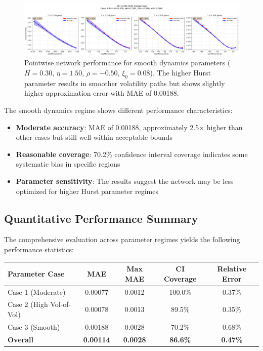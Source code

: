 	\begin{figure}[ht]
		\centering
		\includegraphics[width=\textwidth]{../images/pointwise_case3_comparison.png}
		\caption{Pointwise network performance for smooth dynamics parameters ($H = 0.30$, $\eta = 1.50$, $\rho = -0.50$, $\xi_0 = 0.08$). The higher Hurst parameter results in smoother volatility paths but shows slightly higher approximation error with MAE of 0.00188.}
		\label{fig:pointwise-case3}
	\end{figure}
				
	The smooth dynamics regime shows different performance characteristics:
	
	\begin{itemize}[nosep]
		\item \textbf{Moderate accuracy}: MAE of 0.00188, approximately 2.5× higher than other cases but still well within acceptable bounds
		\item \textbf{Reasonable coverage}: 70.2\% confidence interval coverage indicates some systematic bias in specific regions
		\item \textbf{Parameter sensitivity}: The results suggest the network may be less optimized for higher Hurst parameter regimes
	\end{itemize}
				
	\subsection{Quantitative Performance Summary}
	
	The comprehensive evaluation across parameter regimes yields the following performance statistics:
	
	\begin{center}
		\begin{tabular}{@{}lcccc@{}}
			\toprule
			\textbf{Parameter Case} & \textbf{MAE} & \textbf{Max MAE} & \textbf{CI Coverage} & \textbf{Relative Error} \\
			\midrule
			Case 1 (Moderate) & 0.00077 & 0.0012 & 100.0\% & 0.37\% \\
			Case 2 (High Vol-of-Vol) & 0.00078 & 0.0013 & 89.5\% & 0.35\% \\
			Case 3 (Smooth) & 0.00188 & 0.0028 & 70.2\% & 0.68\% \\
			\midrule
			\textbf{Overall} & \textbf{0.00114} & \textbf{0.0028} & \textbf{86.6\%} & \textbf{0.47\%} \\
			\bottomrule
		\end{tabular}
	\end{center}
	
